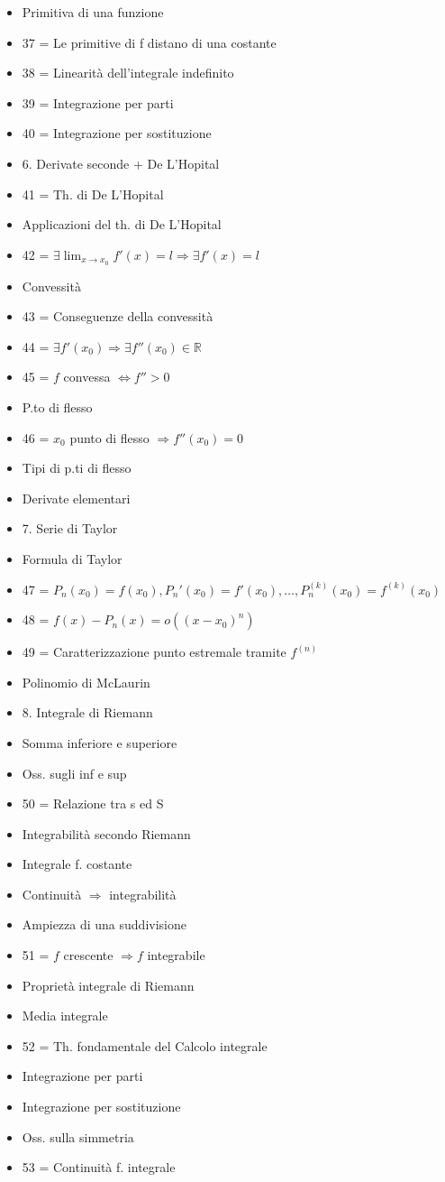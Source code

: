 \begin{itemize}
\item Primitiva di una funzione
\item 37 = Le primitive di f distano di una costante
\item 38 = Linearità dell’integrale indefinito
\item 39 = Integrazione per parti
\item 40 = Integrazione per sostituzione
\item 6. Derivate seconde + De L’Hopital
\item 41 = Th. di De L’Hopital
\item Applicazioni del th. di De L’Hopital
\item 42 = $\exists\lim_{x\to x_0}f'(x)=l\Rightarrow\exists f'(x)=l$
\item Convessità
\item 43 = Conseguenze della convessità
\item 44 = $\exists f'(x_0)\Rightarrow\exists f''(x_0)\in\mathbb R$
\item 45 = $f$ convessa $\iff f''>0$
\item P.to di flesso
\item 46 = $x_0$ punto di flesso $\Rightarrow f''(x_0)=0$
\item Tipi di p.ti di flesso
\item Derivate elementari
\item 7. Serie di Taylor
\item Formula di Taylor
\item 47 = $P_n(x_0)=f(x_0), P_n'(x_0)=f'(x_0),\ldots,P_n^{(k)}(x_0)=f^{(k)}(x_0)$
\item 48 = $f(x)-P_n(x)=o((x-x_0)^n)$
\item 49 = Caratterizzazione punto estremale tramite $f^{(n)}$
\item Polinomio di McLaurin
\end{itemize}
\begin{itemize}
\item 8. Integrale di Riemann
\item Somma inferiore e superiore
\item Oss. sugli inf e sup
\item 50 = Relazione tra s ed S
\item Integrabilità secondo Riemann
\item Integrale f. costante
\item Continuità $\Rightarrow$ integrabilità
\item Ampiezza di una suddivisione
\item 51 = $f$ crescente $\Rightarrow f$ integrabile
\item Proprietà integrale di Riemann
\item Media integrale
\item 52 = Th. fondamentale del Calcolo integrale
\item Integrazione per parti
\item Integrazione per sostituzione
\item Oss. sulla simmetria
\item 53 = Continuità f. integrale
\end{itemize}

